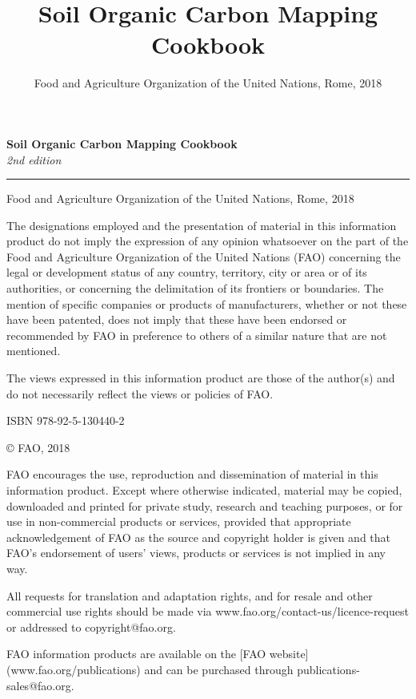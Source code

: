 \documentclass[10pt,b5paper,]{book}
\title{Soil Organic Carbon Mapping Cookbook}
\author{Food and Agriculture Organization of the United Nations, Rome, 2018}
\date{}
\theoremstyle{definition}
\theoremstyle{definition}
\theoremstyle{definition}
\theoremstyle{remark}
\begin{document}
\maketitle

\pagestyle{plain}

\begin{titlepage}
    \begin{center}
        \vspace*{4cm}
        \Large

        \textcolor{astral}{\textbf{Soil Organic Carbon Mapping Cookbook\\}}
        \vspace{0.5cm}
        \normalsize
        \emph{2nd edition}
        \vfill
        \noindent
        {\color{astral}\rule{\linewidth}{0.5mm} }

        Food and Agriculture Organization of the United Nations, Rome, 2018
    \end{center}
\end{titlepage}

\clearpage
\thispagestyle{empty}

\vfill
{\footnotesize
\vspace*{4cm}
\vfill
The designations employed and the presentation of material in this information product do not imply the expression of any opinion whatsoever on the part of the Food and Agriculture Organization of the United Nations (FAO) concerning the legal or development status of any country, territory, city or area or of its authorities, or concerning the delimitation of its frontiers or boundaries. The mention of specific companies or products of manufacturers, whether or not these have been patented, does not imply that these have been endorsed or recommended by FAO in preference to others of a similar nature that are not mentioned.

The views expressed in this information product are those of the author(s) and do not necessarily reflect the views or policies of FAO.

ISBN 978-92-5-130440-2

\copyright \xspace FAO, 2018

FAO encourages the use, reproduction and dissemination of material in this information product. Except where otherwise indicated, material may be copied, downloaded and printed for private study, research and teaching purposes, or for use in non-commercial products or services, provided that appropriate acknowledgement of FAO as the source and copyright holder is given and that FAO’s endorsement of users’ views, products or services is not implied in any way.

All requests for translation and adaptation rights, and for resale and other commercial use rights should be made via www.fao.org/contact-us/licence-request or addressed to copyright@fao.org.


FAO information products are available on the [FAO website](www.fao.org/publications) and can be purchased through publications-sales@fao.org.
}
\end{document}
